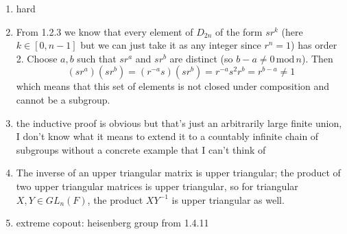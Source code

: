 \documentclass[]{article}
\newcommand{\md}{\,\text{mod}\,}
\begin{document}
\begin{enumerate}
\item {\color{red} hard}


\item From 1.2.3 we know that every element of $D_{2n}$ of the form $sr^k$ (here $k \in [0,n-1]$ but we can just take it as any integer since $r^n = 1$) has order 2. Choose $a,b$ such that $sr^a$ and $sr^b$ are distinct (so $b-a \neq 0 \md n$). Then
\begin{equation}
(sr^a)(sr^b) = (r^{-a}s)(sr^b) = r^{-a}s^2r^b = r^{b-a} \neq 1
\end{equation}
which means that this set of elements is not closed under composition and cannot be a subgroup.


\item {\color{red} the inductive proof is obvious but that's just an arbitrarily large finite union, I don't know what it means to extend it to a countably infinite chain of subgroups without a concrete example that I can't think of}


\item The inverse of an upper triangular matrix is upper triangular; the product of two upper triangular matrices is upper triangular, so for triangular $X,Y \in GL_n(F)$, the product $XY^{-1}$ is upper triangular as well.


\item extreme copout: heisenberg group from 1.4.11


\end{enumerate}
\end{document}
